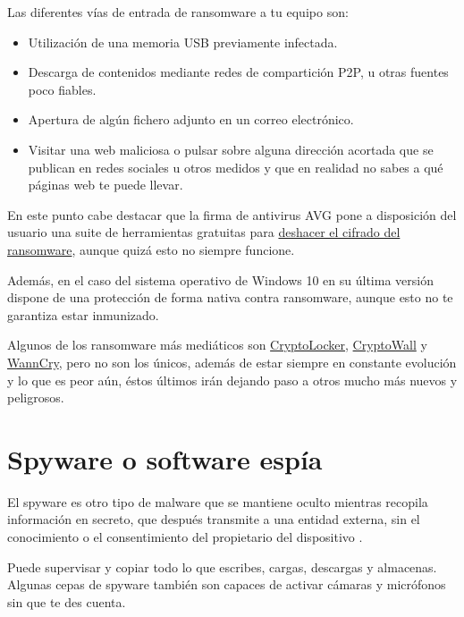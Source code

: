 \documentclass[
  spanish,
  a4paper,
  openany]{book}
\begin{document}
Las diferentes vías de entrada de ransomware a tu equipo son:

\begin{itemize}
\item
  Utilización de una memoria USB previamente infectada.
\item
  Descarga de contenidos mediante redes de compartición P2P, u otras fuentes poco fiables.
\item
  Apertura de algún fichero adjunto en un correo electrónico.
\item
  Visitar una web maliciosa o pulsar sobre alguna dirección acortada que se publican en redes sociales u otros medidos y que en realidad no sabes a qué páginas web te puede llevar.
\end{itemize}

En este punto cabe destacar que la firma de antivirus AVG pone a disposición del usuario una suite de herramientas gratuitas para \href{https://www.avg.com/es-es/ransomware-decryption-tools}{deshacer el cifrado del ransomware}, aunque quizá esto no siempre funcione.

Además, en el caso del sistema operativo de Windows 10 en su última versión dispone de una protección de forma nativa contra ransomware, aunque esto no te garantiza estar inmunizado.

Algunos de los ransomware más mediáticos son \href{https://es.wikipedia.org/wiki/CryptoLocker}{CryptoLocker}, \href{https://es.wikipedia.org/wiki/Ransomware\#CryptoWall}{CryptoWall} y \href{https://es.wikipedia.org/wiki/WannaCry}{WannCry}, pero no son los únicos, además de estar siempre en constante evolución y lo que es peor aún, éstos últimos irán dejando paso a otros mucho más nuevos y peligrosos.

\hypertarget{spyware-o-software-espuxeda}{%
\section{Spyware o software espía}\label{spyware-o-software-espuxeda}}

El spyware es otro tipo de malware que se mantiene oculto mientras recopila información en secreto, que después transmite a una entidad externa, sin el conocimiento o el consentimiento del propietario del dispositivo \citep{AVAST-spyware}.

Puede supervisar y copiar todo lo que escribes, cargas, descargas y almacenas. Algunas cepas de spyware también son capaces de activar cámaras y micrófonos sin que te des cuenta.
\end{document}
